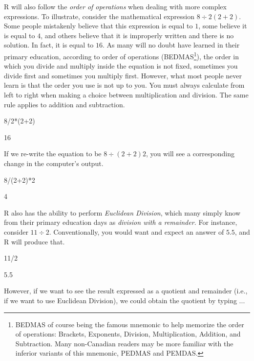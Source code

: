R will also follow the \textit{order of operations} when dealing with more complex expressions.  To illustrate, consider the mathematical expression $8\div2(2+2)$. Some people mistakenly believe that this expression is equal to $1$, some believe it is equal to $4$, and others believe that it is improperly written and there is no solution. In fact, it is equal to $16$. As many will no doubt have learned in their primary education, according to order of operations (BEDMAS\footnote{BEDMAS of course being the famous mnemonic to help memorize the order of operations: Brackets, Exponents, Division, Multiplication, Addition, and Subtraction. Many non-Canadian readers may be more familiar with the inferior variants of this mnemonic, PEDMAS and PEMDAS.}), the order in which you divide and multiply inside the equation is not fixed, sometimes you divide first and sometimes you multiply first. However, what most people never learn is that the order you use is not up to you. You must always calculate from left to right when making a choice between multiplication and division.  The same rule applies to addition and subtraction.

\begin{inR}
8/2*(2+2)
\end{inR}

\begin{outR}
[1] 16
\end{outR}

\noindent
If we re-write the equation to be $8\div(2+2)2$, you will see a corresponding change in the computer's output.

\begin{inR}
8/(2+2)*2
\end{inR}

\begin{outR}
[1] 4
\end{outR}

R also has the ability to perform \textit{Euclidean Division}, which many simply know from their primary education days as \textit{division with a remainder.}  For instance, consider $11 \div 2$.  Conventionally, you would want and expect an answer of $5.5$, and R will produce that.

\begin{inR}
11/2
\end{inR}

\begin{outR}
[1] 5.5
\end{outR}

\noindent However, if we want to see the result expressed as a quotient and remainder (i.e., if we want to use Euclidean Division), we could obtain the quotient by typing ...

